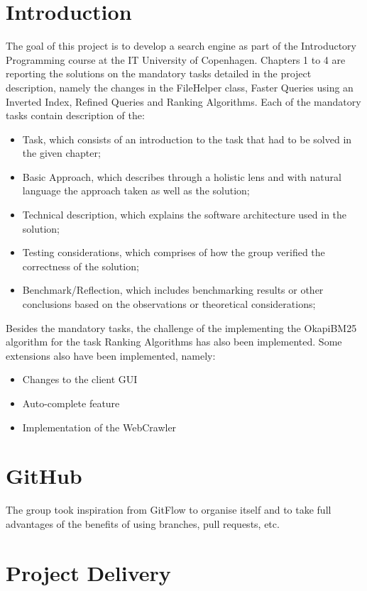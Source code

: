\section{Introduction}
\label{sec:Introduction}
The goal of this project is to develop a search engine as part of the Introductory Programming course at the IT University of Copenhagen. Chapters 1 to 4 are reporting the solutions on the mandatory tasks detailed in the project description, namely the changes in the FileHelper class, Faster Queries using an Inverted Index, Refined Queries and Ranking Algorithms. Each of the mandatory tasks contain description of the:
\begin{itemize}
    \item Task, which consists of an introduction to the task that had to be solved in the given chapter;
    \item Basic Approach, which describes through a holistic lens and with natural language the approach taken as well as the solution;
    \item Technical description, which explains the software architecture used in the solution;
    \item Testing considerations, which comprises of how the group verified the correctness of the solution;
    \item  Benchmark/Reflection, which includes benchmarking results or other conclusions based on the observations or theoretical considerations;
\end{itemize}
Besides the mandatory tasks, the challenge of the implementing the OkapiBM25 algorithm for the task Ranking Algorithms has also been implemented. Some extensions also have been implemented, namely:
\begin{itemize}
    \item Changes to the client GUI
    \item Auto-complete feature
    \item Implementation of the WebCrawler
\end{itemize}

\section{GitHub}
\label{sec:GitHub}
The group took inspiration from GitFlow to organise itself and to take full advantages of the benefits of using branches, pull requests, etc.

\section{Project Delivery}
\label{sec:Project Delivery}

